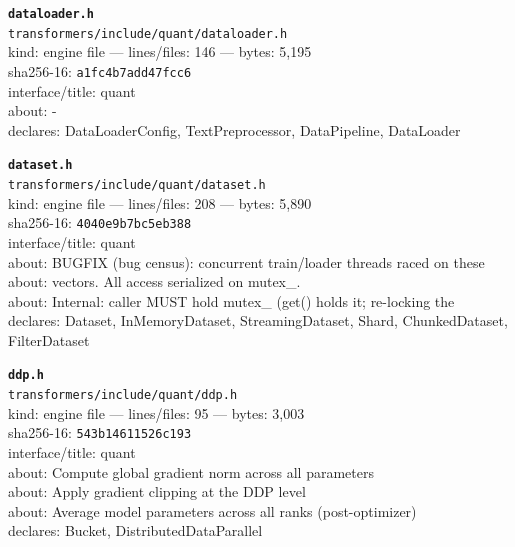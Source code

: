 \noindent\textbf{\texttt{dataloader.h}}\\
\texttt{transformers/include/quant/dataloader.h}\\
kind: engine file --- lines/files: 146 --- bytes: 5,195\\
sha256-16: \texttt{a1fc4b7add47fcc6}\\
interface/title: quant\\
about: -\\
declares: DataLoaderConfig, TextPreprocessor, DataPipeline, DataLoader\\
\vspace*{6.0pt}

\noindent\textbf{\texttt{dataset.h}}\\
\texttt{transformers/include/quant/dataset.h}\\
kind: engine file --- lines/files: 208 --- bytes: 5,890\\
sha256-16: \texttt{4040e9b7bc5eb388}\\
interface/title: quant\\
about: BUGFIX (bug census): concurrent train/loader threads raced on these\\
about: vectors. All access serialized on mutex\_.\\
about: Internal: caller MUST hold mutex\_ (get() holds it; re-locking the\\
declares: Dataset, InMemoryDataset, StreamingDataset, Shard, ChunkedDataset, FilterDataset\\
\vspace*{6.0pt}
\newpage

\noindent\textbf{\texttt{ddp.h}}\\
\texttt{transformers/include/quant/ddp.h}\\
kind: engine file --- lines/files: 95 --- bytes: 3,003\\
sha256-16: \texttt{543b14611526c193}\\
interface/title: quant\\
about: Compute global gradient norm across all parameters\\
about: Apply gradient clipping at the DDP level\\
about: Average model parameters across all ranks (post-optimizer)\\
declares: Bucket, DistributedDataParallel\\
\vspace*{6.0pt}

